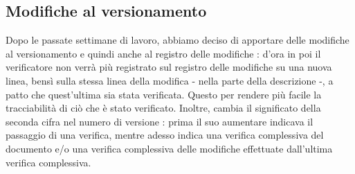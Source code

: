 \subsection{Modifiche al versionamento}
Dopo le passate settimane di lavoro, abbiamo deciso di apportare delle modifiche al versionamento e quindi anche al registro delle modifiche : d'ora in poi il verificatore non verrà più registrato sul registro delle modifiche su una nuova linea, bensì sulla stessa linea della modifica - nella parte della descrizione -, a patto che quest'ultima sia stata verificata. Questo per rendere più facile la tracciabilità di ciò che è stato verificato. Inoltre, cambia il significato della seconda cifra nel numero di versione : prima il suo aumentare indicava il passaggio di una verifica, mentre adesso indica una verifica complessiva del documento e/o una verifica complessiva delle modifiche effettuate dall'ultima verifica complessiva. 